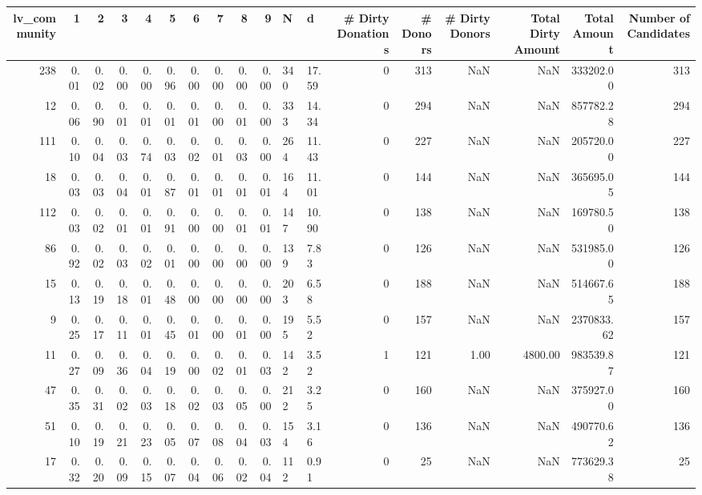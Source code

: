 \begin{tabular}{rrrrrrrrrrllrrrrrr}
\toprule
 lv\_community &    1 &    2 &    3 &    4 &    5 &    6 &    7 &    8 &    9 &   N &     d &  \# Dirty Donations &  \# Donors &  \# Dirty Donors &  Total Dirty Amount &  Total Amount &  Number of Candidates \\
\midrule
          238 & 0.01 & 0.02 & 0.00 & 0.00 & 0.96 & 0.00 & 0.00 & 0.00 & 0.00 & 340 & 17.59 &                  0 &       313 &             NaN &                 NaN &     333202.00 &                   313 \\
           12 & 0.06 & 0.90 & 0.01 & 0.01 & 0.01 & 0.01 & 0.00 & 0.01 & 0.00 & 333 & 14.34 &                  0 &       294 &             NaN &                 NaN &     857782.28 &                   294 \\
          111 & 0.10 & 0.04 & 0.03 & 0.74 & 0.03 & 0.02 & 0.01 & 0.03 & 0.00 & 264 & 11.43 &                  0 &       227 &             NaN &                 NaN &     205720.00 &                   227 \\
           18 & 0.03 & 0.03 & 0.04 & 0.01 & 0.87 & 0.01 & 0.01 & 0.01 & 0.01 & 164 & 11.01 &                  0 &       144 &             NaN &                 NaN &     365695.05 &                   144 \\
          112 & 0.03 & 0.02 & 0.01 & 0.01 & 0.91 & 0.00 & 0.00 & 0.01 & 0.01 & 147 & 10.90 &                  0 &       138 &             NaN &                 NaN &     169780.50 &                   138 \\
           86 & 0.92 & 0.02 & 0.03 & 0.02 & 0.01 & 0.00 & 0.00 & 0.00 & 0.00 & 139 &  7.83 &                  0 &       126 &             NaN &                 NaN &     531985.00 &                   126 \\
           15 & 0.13 & 0.19 & 0.18 & 0.01 & 0.48 & 0.00 & 0.00 & 0.00 & 0.00 & 203 &  6.58 &                  0 &       188 &             NaN &                 NaN &     514667.65 &                   188 \\
            9 & 0.25 & 0.17 & 0.11 & 0.01 & 0.45 & 0.01 & 0.00 & 0.01 & 0.00 & 195 &  5.52 &                  0 &       157 &             NaN &                 NaN &    2370833.62 &                   157 \\
           11 & 0.27 & 0.09 & 0.36 & 0.04 & 0.19 & 0.00 & 0.02 & 0.01 & 0.03 & 142 &  3.52 &                  1 &       121 &            1.00 &             4800.00 &     983539.87 &                   121 \\
           47 & 0.35 & 0.31 & 0.02 & 0.03 & 0.18 & 0.02 & 0.03 & 0.05 & 0.00 & 212 &  3.25 &                  0 &       160 &             NaN &                 NaN &     375927.00 &                   160 \\
           51 & 0.10 & 0.19 & 0.21 & 0.23 & 0.05 & 0.07 & 0.08 & 0.04 & 0.03 & 154 &  3.16 &                  0 &       136 &             NaN &                 NaN &     490770.62 &                   136 \\
           17 & 0.32 & 0.20 & 0.09 & 0.15 & 0.07 & 0.04 & 0.06 & 0.02 & 0.04 & 112 &  0.91 &                  0 &        25 &             NaN &                 NaN &     773629.38 &                    25 \\
\bottomrule
\end{tabular}
